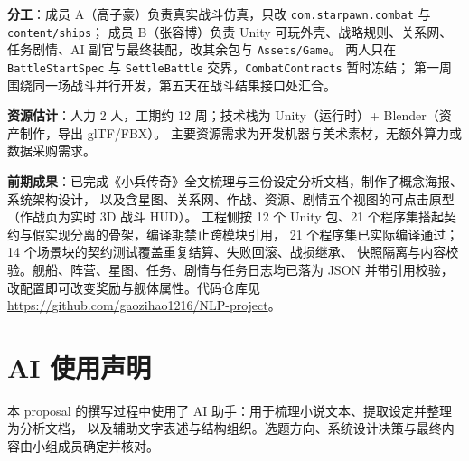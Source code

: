 \documentclass[UTF8,a4paper,11pt]{ctexart}
\begin{document}
\noindent\textbf{分工}：成员 A（高子豪）负责真实战斗仿真，只改 \texttt{com.starpawn.combat} 与 \texttt{content/ships}；
成员 B（张容博）负责 Unity 可玩外壳、战略规则、关系网、任务剧情、AI 副官与最终装配，改其余包与 \texttt{Assets/Game}。
两人只在 \texttt{BattleStartSpec} 与 \texttt{SettleBattle} 交界，\texttt{CombatContracts} 暂时冻结；
第一周围绕同一场战斗并行开发，第五天在战斗结果接口处汇合。

\textbf{资源估计}：人力 2 人，工期约 12 周；技术栈为 Unity（运行时）+ Blender（资产制作，导出 glTF/FBX）。
主要资源需求为开发机器与美术素材，无额外算力或数据采购需求。

\textbf{前期成果}：已完成《小兵传奇》全文梳理与三份设定分析文档，制作了概念海报、系统架构设计，
以及含星图、关系网、作战、资源、剧情五个视图的可点击原型（作战页为实时 3D 战斗 HUD）。
工程侧按 12 个 Unity 包、21 个程序集搭起契约与假实现分离的骨架，编译期禁止跨模块引用，
21 个程序集已实际编译通过；14 个场景块的契约测试覆盖重复结算、失败回滚、战损继承、
快照隔离与内容校验。舰船、阵营、星图、任务、剧情与任务日志均已落为 JSON 并带引用校验，
改配置即可改变奖励与舰体属性。代码仓库见 \url{https://github.com/gaozihao1216/NLP-project}。

\section{AI 使用声明}
本 proposal 的撰写过程中使用了 AI 助手：用于梳理小说文本、提取设定并整理为分析文档，
以及辅助文字表述与结构组织。选题方向、系统设计决策与最终内容由小组成员确定并核对。
\end{document}
